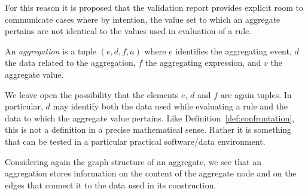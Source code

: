 For this reason it is proposed that the validation report provides explicit
room to communicate cases where by intention, the value set to which an
aggregate pertains are not identical to the values used in evaluation of a
rule. 
%
\begin{definition}[aggregation]
\label{def:aggregation}
An \emph{aggregation} is a tuple  
$(e, d, f, a)$
where $e$ identifies the aggregating event, $d$ the data related to the
aggregation, $f$ the aggregating expression, and $v$ the aggregate value.
\end{definition}
We leave open the possibility that the elements $e$, $d$ and $f$ are again
tuples. In particular, $d$ may identify both the data used while evaluating a
rule and the data to which the aggregate value pertains.  Like
Definition~\ref{def:confrontation}, this is not a definition in a precise
mathematical sense. Rather it is something that can be tested in a particular
practical software/data environment. 

Considering again the graph structure of an aggregate, we see that an
aggregation stores information on the content of the aggregate node and on the
edges that connect it to the data used in its construction.


